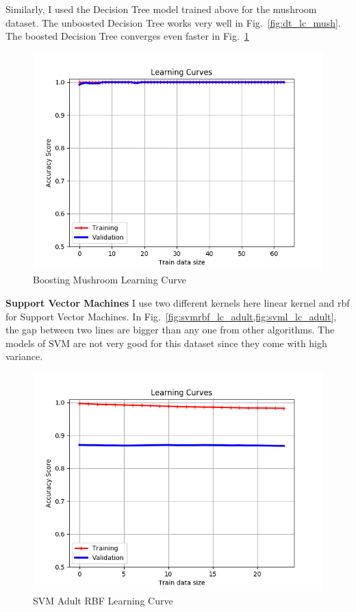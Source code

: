 \documentclass[         %
aps,                    %
prl,                    %
showpacs,               %
superscriptaddress,    %
nofootinbib,            %
twocolumn,             %
showkeys,               %
preprintnumbers,        %
floatfix               %
]{revtex4-1}               %
\begin{document}
Similarly, I used the Decision Tree model trained above for the mushroom dataset.
The unboosted Decision Tree works very well in Fig.~\ref{fig:dt_lc_mush}. 
The boosted Decision Tree converges even faster in Fig.~\ref{fig:svmrbf_lc_mush}
\begin{figure}[h!]
  \centering \includegraphics[width=\linewidth]{../boosting_mush_LearningCurve}
  \caption{Boosting Mushroom Learning Curve\label{fig:svmrbf_lc_mush}}
\end{figure}

{\bf Support Vector Machines}\label{svm}
I use two different kernels here linear kernel and rbf for Support Vector Machines.
In Fig.~\ref{fig:svmrbf_lc_adult,fig:svml_lc_adult}, the gap between two lines are bigger than any one from other algorithms.
The models of SVM are not very good for this dataset since they come with high variance.
\begin{figure}[h!]
  \centering \includegraphics[width=\linewidth]{../svm_income_LearningCurve_rbf}
  \caption{SVM Adult RBF Learning Curve\label{fig:svmrbf_lc_adult}}
\end{figure}
\end{document}
